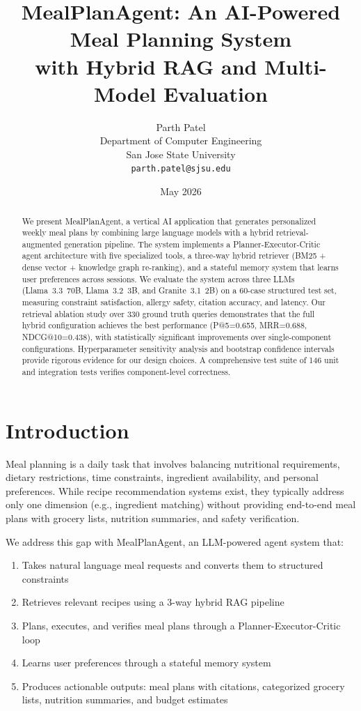 \documentclass[11pt,twocolumn]{article}
\title{\textbf{MealPlanAgent: An AI-Powered Meal Planning System\\with Hybrid RAG and Multi-Model Evaluation}}
\author{Parth Patel\\
\small Department of Computer Engineering\\
\small San Jose State University\\
\small \texttt{parth.patel@sjsu.edu}}
\date{May 2026}
\begin{document}
\maketitle

\begin{abstract}
We present MealPlanAgent, a vertical AI application that generates personalized weekly meal plans by combining large language models with a hybrid retrieval-augmented generation pipeline. The system implements a Planner-Executor-Critic agent architecture with five specialized tools, a three-way hybrid retriever (BM25 + dense vector + knowledge graph re-ranking), and a stateful memory system that learns user preferences across sessions. We evaluate the system across three LLMs (Llama~3.3~70B, Llama~3.2~3B, and Granite~3.1~2B) on a 60-case structured test set, measuring constraint satisfaction, allergy safety, citation accuracy, and latency. Our retrieval ablation study over 330 ground truth queries demonstrates that the full hybrid configuration achieves the best performance (P@5=0.655, MRR=0.688, NDCG@10=0.438), with statistically significant improvements over single-component configurations. Hyperparameter sensitivity analysis and bootstrap confidence intervals provide rigorous evidence for our design choices. A comprehensive test suite of 146 unit and integration tests verifies component-level correctness.
\end{abstract}

\section{Introduction}

Meal planning is a daily task that involves balancing nutritional requirements, dietary restrictions, time constraints, ingredient availability, and personal preferences. While recipe recommendation systems exist, they typically address only one dimension (e.g., ingredient matching) without providing end-to-end meal plans with grocery lists, nutrition summaries, and safety verification.

We address this gap with MealPlanAgent, an LLM-powered agent system that:
\begin{enumerate}[nosep]
    \item Takes natural language meal requests and converts them to structured constraints
    \item Retrieves relevant recipes using a 3-way hybrid RAG pipeline
    \item Plans, executes, and verifies meal plans through a Planner-Executor-Critic loop
    \item Learns user preferences through a stateful memory system
    \item Produces actionable outputs: meal plans with citations, categorized grocery lists, nutrition summaries, and budget estimates
\end{enumerate}
\end{document}
